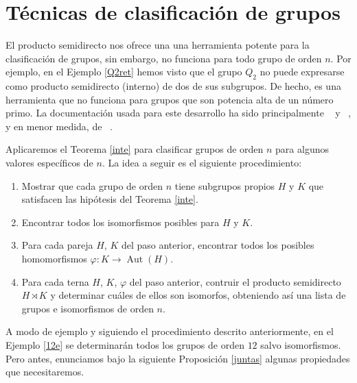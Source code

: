 \blankpage

\chapter{Técnicas de clasificación de grupos}


El producto semidirecto nos ofrece una una herramienta potente para la clasificación de grupos, sin embargo, no funciona para todo grupo de orden $n$. Por ejemplo, en el Ejemplo \ref{Q2ret} hemos visto que el grupo $Q_2$ no puede expresarse como producto semidirecto (interno) de dos de sus subgrupos. De hecho, es una herramienta que no funciona para grupos que son potencia alta de un número primo. La documentación usada para este desarrollo ha sido principalmente ~\cite{jara} y ~\cite{eugenio}, y en menor medida, de ~\cite{abstractrojo}.

Aplicaremos el Teorema \ref{inte} para clasificar grupos de orden $n$ para algunos valores específicos de $n$. La idea a seguir es el siguiente procedimiento:
\begin{enumerate}
    \item Mostrar que cada grupo de orden $n$ tiene subgrupos propios $H$ y $K$ que satisfacen las hipótesis del Teorema \ref{inte}.
    \item Encontrar todos los isomorfismos posibles para $H$ y $K$.
    \item Para cada pareja $H$, $K$ del paso anterior, encontrar todos los posibles homomorfismos $\varphi \colon K \rightarrow \operatorname{Aut}(H)$.
    \item Para cada terna $H$, $K$, $\varphi$ del paso anterior, contruir el producto semidirecto $H \rtimes K$ y determinar cuáles de ellos son isomorfos, obteniendo así una lista de grupos e isomorfismos de orden $n$.
  
\end{enumerate}



A modo de ejemplo y siguiendo el procedimiento descrito anteriormente, en el Ejemplo \ref{12e} se determinarán todos los grupos de orden $12$ salvo isomorfismos. Pero antes, enunciamos bajo la siguiente Proposición \ref{juntas} algunas propiedades que necesitaremos.


